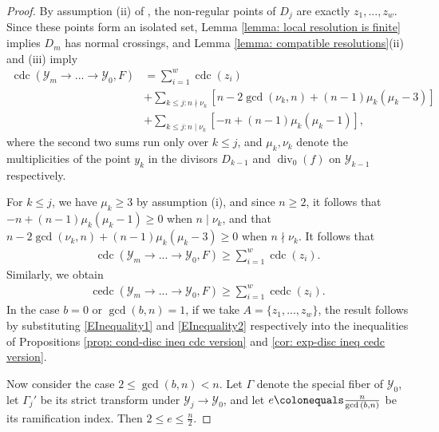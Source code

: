 \documentclass[12pt]{amsart}
\numberwithin{equation}{section}
\theoremstyle{definition}
\newcommand{\Y}{\mathcal{Y}}
\DeclareMathOperator{\divi}{div}
\DeclareMathOperator{\cdc}{cdc}
\DeclareMathOperator{\cedc}{cedc}
\begin{document}
\begin{proof}
    By assumption (ii) of , the non-regular points of $D_j$ are exactly $z_1,...,z_w$. Since these points form an isolated set, Lemma \ref{lemma: local resolution is finite} implies $D_m$ has normal crossings, and Lemma \ref{lemma: compatible resolutions}(ii) and (iii) imply
    \begin{align*}
    \cdc(\Y_m\to...\to\Y_0,F)&=\sum_{i=1}^w\cdc(z_i)\\
    &+\sum_{k\leq j:n\nmid\nu_k}[n-2\gcd(\nu_k,n)+(n-1)\mu_k(\mu_k-3)]\\
        &+\sum_{k\leq j:n\mid\nu_k}[-n+(n-1)\mu_k(\mu_k-1)],
    \end{align*}
    where the second two sums run only over $k\leq j$, and $\mu_k,\nu_k$ denote the multiplicities of the point $y_k$ in the divisors $D_{k-1}$ and $\divi_0(f)$ on $\Y_{k-1}$ respectively.
    
    For $k\leq j$, we have $\mu_k\geq 3$ by assumption (i), and since $n\geq 2$, it follows that $-n+(n-1)\mu_k(\mu_k-1)\geq 0$ when $n \mid \nu_k$, and that $n-2\gcd(\nu_k,n)+(n-1)\mu_k(\mu_k-3)\geq0$ when $n\nmid\nu_k$. 
    It follows that
    \begin{equation}\label{EInequality1}
    \begin{aligned}
    \cdc(\Y_m\to...\to\Y_0,F)\geq\sum_{i=1}^w\cdc(z_i).
      \end{aligned}
      \end{equation}
    Similarly, we obtain
    \begin{equation}\label{EInequality2}
    \begin{aligned}
      \cedc(\Y_m\to...\to\Y_0,F)\geq\sum_{i=1}^w\cedc(z_i).
      \end{aligned}
      \end{equation}
    In the case $b=0$ or $\gcd(b,n)=1$, if we take $A=\{z_1,...,z_w\}$, the result follows by substituting \eqref{EInequality1} and \eqref{EInequality2} respectively into the inequalities of Propositions \ref{prop: cond-disc ineq cdc version} and \ref{cor: exp-disc ineq cedc version}.
    
    Now consider the case $2 \leq \gcd(b,n) < n$. Let $\Gamma$ denote the special fiber of $\Y_0$, let $\Gamma_j'$ be its strict transform under $\Y_j\to\Y_0$, and let $e \colonequals \frac{n}{\gcd{(b,n)}}$ be its ramification index. Then $2\leq e\leq\frac{n}{2}$.
    

\end{proof}
\end{document}
